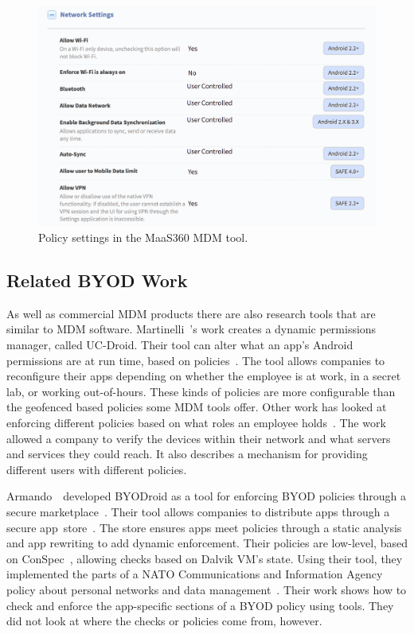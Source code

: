 \documentclass[thesis.tex]{subfiles}
\begin{document}
\begin{figure}
  \centering
  \includegraphics[width=\textwidth]{figures/maas360-policy.png}
  \caption{Policy settings in the MaaS360 \ac{MDM} tool.}
  \label{fig:maas360-policy}
\end{figure}

\subsection{Related BYOD Work}

As well as commercial \ac{MDM} products there are also research tools
that are similar to \ac{MDM} software. Martinelli~\etal{}'s work
creates a dynamic permissions manager, called UC-Droid. Their tool can
alter what an app's Android permissions are at run time, based on
policies~\cite{martinelli_enhancing_2016}.  The tool allows companies
to reconfigure their apps depending on whether the employee is at
work, in a secret lab, or working out-of-hours. These kinds of
policies are more configurable than the geofenced based policies some
\ac{MDM} tools offer. Other work has looked at enforcing different
policies based on what roles an employee
holds~\cite{costantino_towards_2013}. The work allowed a company to
verify the devices within their network and what servers and services
they could reach. It also describes a mechanism for providing
different users with different policies.

Armando~\etal~developed BYODroid as a tool for enforcing BYOD policies through a
secure marketplace~\cite{armando_bring_2013}. Their tool allows companies to
distribute apps through a secure app~store~\cite{armando_enabling_2014}. The
store ensures apps meet policies through a static analysis and
app rewriting to add dynamic enforcement. Their policies are low-level, based on
ConSpec~\cite{aktug_conspec_2008}, allowing checks based on Dalvik VM's state.
Using their tool, they implemented the parts of a NATO Communications and
Information Agency policy about personal networks and data
management~\cite{armando_developing_2016}. Their work shows how to check and enforce the app-specific
sections of a BYOD policy using tools. They did not
look at where the checks or policies come from, however.
\end{document}
